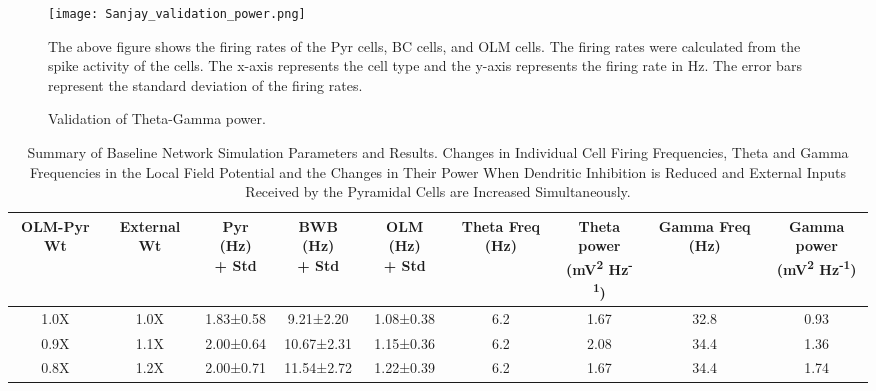 \begin{figure}[htbp]
    \centering
    \texttt{[image: Sanjay\_validation\_power.png]}
    \caption[Validation of the firing rates]{Validation of Theta-Gamma power.}\label{fig:validation_power}
    \begin{minipage}{0.9\textwidth}
        The above figure shows the firing rates of the Pyr cells, BC cells, and OLM cells. The firing rates were calculated from the spike activity of the cells. The x-axis represents the cell type and the y-axis represents the firing rate in Hz. The error bars represent the standard deviation of the firing rates.
    \end{minipage}
\end{figure}
\begin{table}[htbp]
    \centering
    \caption[Summary of Baseline Network Simulation Parameters and Results]{Summary of Baseline Network Simulation Parameters and Results. Changes in Individual Cell Firing Frequencies, Theta and Gamma Frequencies in the Local Field Potential and the Changes in Their Power When Dendritic Inhibition is Reduced and External Inputs Received by the Pyramidal Cells are Increased Simultaneously.}\label{tab:baseline_results}
    \begin{adjustbox}{width=\textwidth}
        \begin{tabular}{ccccccccc}
            \hline
            OLM-Pyr Wt & External Wt & \CellWithForcedBreak{Pyr (Hz)                                                     \\ + Std} & \CellWithForcedBreak{BWB (Hz) \\ + Std} & \CellWithForcedBreak{OLM (Hz) \\ + Std} & Theta Freq (Hz) & \CellWithForcedBreak{Theta power \\ (mV\textsuperscript{2} Hz\textsuperscript{-1})} & Gamma Freq (Hz) & \CellWithForcedBreak{Gamma power \\ (mV\textsuperscript{2} Hz\textsuperscript{-1})} \\
            \hline
            1.0X       & 1.0X        & 1.83±0.58                     & 9.21±2.20  & 1.08±0.38 & 6.2 & 1.67 & 32.8 & 0.93 \\
            0.9X       & 1.1X        & 2.00±0.64                     & 10.67±2.31 & 1.15±0.36 & 6.2 & 2.08 & 34.4 & 1.36 \\
            0.8X       & 1.2X        & 2.00±0.71                     & 11.54±2.72 & 1.22±0.39 & 6.2 & 1.67 & 34.4 & 1.74 \\

\end{tabular}
\end{adjustbox}
\end{table}
